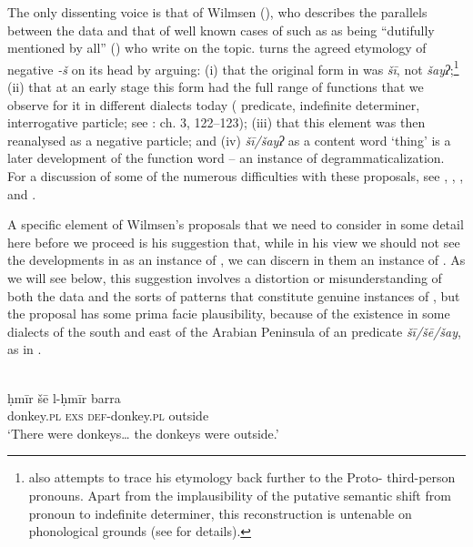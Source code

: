 \documentclass[output=paper]{langsci/langscibook}
\begin{document}
The only dissenting voice is that of Wilmsen (\citeyear{Wilmsen2013,Wilmsen2014}), who describes the parallels between the  data and that of well known cases of  such as  as being “dutifully mentioned by all” (\citeyear[117]{Wilmsen2014}) who write on the topic. \citet{Wilmsen2014} turns the agreed etymology of negative \textit{{}-š} on its head by arguing: (i) that the original form in  was \textit{šī}, not \textit{šayʔ};\footnote{\citet{Wilmsen2014} also attempts to trace his etymology back further to the Proto- third-person pronouns. Apart from the implausibility of the putative semantic shift from  pronoun to indefinite determiner, this reconstruction is untenable on phonological grounds (see \citealt{Al-Jallad2015review} for details).} (ii) that at an early stage this form had the full range of functions that we observe for it in different  dialects today ( predicate, indefinite determiner, interrogative particle; see \citealt{Wilmsen2014}: ch. 3, 122–123); (iii) that this element was then reanalysed as a negative particle; and (iv) \textit{šī/šayʔ} as a content word ‘thing’ is a later development of the function word – an instance of degrammaticalization. For a discussion of some of the numerous difficulties with these proposals, see \citet{Al-Jallad2015review}, \citet{Pat-El2016}, \citet{Souag2016review}, and \citet{Lucas2018}.

A specific element of Wilmsen’s proposals that we need to consider in some detail here before we proceed is his suggestion that, while in his view we should not see the developments in  as an instance of , we can discern in them an instance of . As we will see below, this suggestion involves a distortion or misunderstanding of both the  data and the sorts of patterns that constitute genuine instances of , but the proposal has some prima facie plausibility, because of the existence in some dialects of the south and east of the Arabian Peninsula of an  predicate \textit{šī/šē/šay}, as in .


\ea\label{oma}
{          \citep[92]{Eades2009}}\\
\gll ḥmīr šē l-ḥmīr barra\\
     donkey.\textsc{pl} \textsc{exs} \textsc{def-}donkey.\textsc{pl} outside\\
\glt ‘There were donkeys… the donkeys were outside.’
\z
\end{document}
